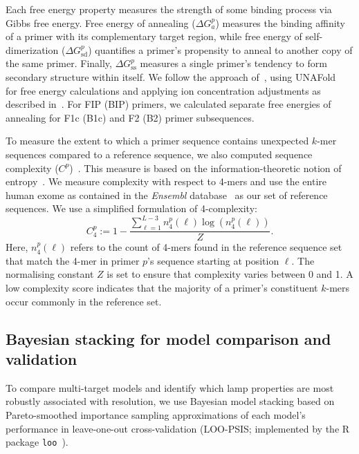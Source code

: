 \documentclass[../thesis.tex]{subfiles}
\begin{document}
Each free energy property measures the strength of some binding process via Gibbs free energy. Free energy of annealing ($\Delta G_a^p$) measures the binding affinity of a primer with its complementary target region, while free energy of self-dimerization ($\Delta G^p_{\text{sd}}$) quantifies a primer's propensity to anneal to another copy of the same primer. Finally, $\Delta G^p_{\text{ss}}$ measures a single primer's tendency to form secondary structure within itself. We follow the approach of~\citet{doring_modeling_2019}, using UNAFold~\citep{markham_unafold_2008} for free energy calculations and applying ion concentration adjustments as described in~\citet{peyret_prediction_2000}. For FIP (BIP) primers, we calculated separate free energies of annealing for F1c (B1c) and F2 (B2) primer subsequences.

To measure the extent to which a primer sequence contains unexpected $k$-mer sequences compared to a reference sequence, we also computed sequence complexity ($C^p$)~\citep{nielsen_design_2003, xia_evaluating_2010}. This measure is based on the information-theoretic notion of entropy~\citep{shannon_mathematical_1948}. We measure complexity with respect to 4-mers and use the entire human exome as contained in the \emph{Ensembl} database~\citep{yates_ensembl_2020} as our set of reference sequences. We use a simplified formulation of 4-complexity:
\[C^p_4 := 1 -  \frac{\sum_{\ell = 1}^{L-3} n^p_4(\ell) \log (n^p_4(\ell))}{Z}.\]
Here, $n^p_4(\ell)$ refers to the count of 4-mers found in the reference sequence set that match the 4-mer in primer $p$'s sequence starting at position $\ell$. The normalising constant $Z$ is set to ensure that complexity varies between 0 and 1. A low complexity score indicates that the majority of a primer's constituent $k$-mers occur commonly in the reference set.


\subsection{Bayesian stacking for model comparison and validation \label{sec:stacking}}
To compare multi-target models and identify which \gls{lamp} properties are most robustly associated with resolution, we use Bayesian model stacking based on Pareto-smoothed importance sampling approximations of each model's performance in leave-one-out cross-validation (LOO-PSIS; implemented by the R package \texttt{loo}~\citep{vehtari_loo_2020}).
\end{document}
